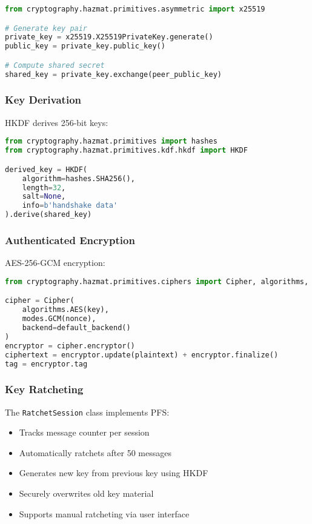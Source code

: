 \documentclass[conference]{IEEEtran}
\begin{document}
\begin{lstlisting}[language=Python]
from cryptography.hazmat.primitives.asymmetric import x25519

# Generate key pair
private_key = x25519.X25519PrivateKey.generate()
public_key = private_key.public_key()

# Compute shared secret
shared_key = private_key.exchange(peer_public_key)
\end{lstlisting}

\subsubsection{Key Derivation}
HKDF derives 256-bit keys:

\begin{lstlisting}[language=Python]
from cryptography.hazmat.primitives import hashes
from cryptography.hazmat.primitives.kdf.hkdf import HKDF

derived_key = HKDF(
    algorithm=hashes.SHA256(),
    length=32,
    salt=None,
    info=b'handshake data'
).derive(shared_key)
\end{lstlisting}

\subsubsection{Authenticated Encryption}
AES-256-GCM encryption:

\begin{lstlisting}[language=Python]
from cryptography.hazmat.primitives.ciphers import Cipher, algorithms, modes

cipher = Cipher(
    algorithms.AES(key),
    modes.GCM(nonce),
    backend=default_backend()
)
encryptor = cipher.encryptor()
ciphertext = encryptor.update(plaintext) + encryptor.finalize()
tag = encryptor.tag
\end{lstlisting}

\subsubsection{Key Ratcheting}
The \texttt{RatchetSession} class implements PFS:

\begin{itemize}
    \item Tracks message counter per session
    \item Automatically ratchets after 50 messages
    \item Generates new key from previous key using HKDF
    \item Securely overwrites old key material
    \item Supports manual ratcheting via user interface
\end{itemize}
\end{document}
